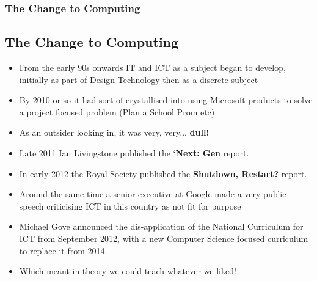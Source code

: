 \documentclass{beamer}
\begin{document}
\begin{frame}
  \frametitle{The Change to Computing}
  \subsection{The Change to Computing}

  \begin{itemize}
    
  \item From the early 90s onwards IT and ICT as a subject began to develop, initially as part of Design Technology then
    as a discrete subject
    
  \item By 2010 or so it had sort of crystallised into using Microsoft products to solve a project focused problem (Plan
    a School Prom etc)
    
  \item As an outsider looking in, it was very, very...  \textbf{dull!}
    
  \item Late 2011 Ian Livingstone published the `\textbf{Next: Gen} report.
    
  \item In early 2012 the Royal Society published the \textbf{Shutdown, Restart?} report.
    
  \item Around the same time a senior executive at Google made a very public speech criticising ICT in this country as
    not fit for purpose
    
  \item Michael Gove announced the dis-application of the National Curriculum for ICT from September 2012, with a new
    Computer Science focused curriculum to replace it from 2014.
    
  \item Which meant in theory we could teach whatever we liked!
  \end{itemize}
\end{frame}
\end{document}
